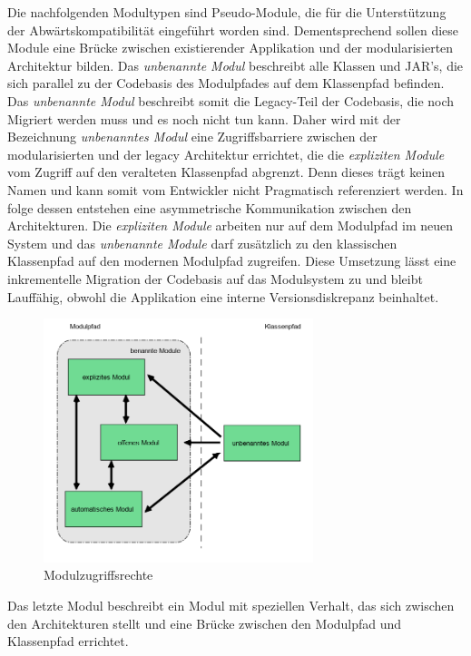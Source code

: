     \newline Die nachfolgenden Modultypen sind Pseudo-Module, die für die Unterstützung der Abwärtskompatibilität eingeführt worden sind. 
    Dementsprechend sollen diese Module eine Brücke zwischen existierender Applikation und der modularisierten Architektur bilden. 
    \newline Das \textit{unbenannte Modul} beschreibt alle Klassen und JAR's, die sich parallel zu der Codebasis des Modulpfades auf dem Klassenpfad befinden. 
    Das \textit{unbenannte Modul} beschreibt somit die Legacy-Teil der Codebasis, die noch Migriert werden muss und es noch nicht tun kann.
    Daher wird mit der Bezeichnung \textit{unbenanntes Modul} eine Zugriffsbarriere zwischen der modularisierten und der legacy Architektur errichtet, die die \textit{expliziten Module} vom Zugriff auf den veralteten Klassenpfad abgrenzt. 
    Denn dieses trägt keinen Namen und kann somit vom Entwickler nicht Pragmatisch referenziert werden. 
    \newline In folge dessen entstehen eine asymmetrische Kommunikation zwischen den Architekturen. 
    Die \textit{expliziten Module} arbeiten nur auf dem Modulpfad im neuen System und das \textit{unbenannte Module} darf zusätzlich zu den klassischen Klassenpfad auf den modernen Modulpfad zugreifen. 
    Diese Umsetzung lässt eine inkrementelle Migration der Codebasis auf das Modulsystem zu und bleibt Lauffähig, obwohl die Applikation eine interne Versionsdiskrepanz beinhaltet.
    \begin{figure}[h]
      \centering
      \includegraphics[width=0.7\textwidth]{material/images/module-access.png}
      \caption{Modulzugriffsrechte}
      \label{fig:kopplung}
    \end{figure}
    \newline Das letzte Modul beschreibt ein Modul mit speziellen Verhalt, das sich zwischen den Architekturen stellt und eine Brücke zwischen den Modulpfad und Klassenpfad errichtet.
